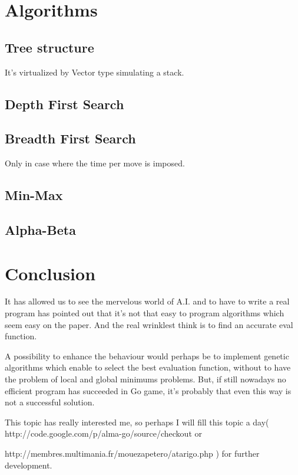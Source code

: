 \documentclass{book}
\begin{document}
\chapter{Algorithms}

\section{Tree structure}
It's virtualized by Vector type simulating a stack.
\section{Depth First Search}
\section{Breadth First Search}
Only in case where the time per move is imposed.
\section{Min-Max}
\section{Alpha-Beta}



\chapter{Conclusion}
It has allowed us to see the mervelous world of A.I. and to have to write a real program has pointed out that it's not that easy to program algorithms which seem easy on the paper.
And the real wrinklest think is to find an accurate eval function.

A possibility to enhance the behaviour would perhaps be to
 implement genetic algorithms which enable to
select the best evaluation function, without 
to have the problem of local and global 
minimums problems. But, if still nowadays no efficient program has succeeded in Go game, it's probably that even this way is not a successful solution.

This topic has really interested me, so perhaps I will fill this topic a
day( http://code.google.com/p/alma-go/source/checkout or
 
http://membres.multimania.fr/mouezapetero/atarigo.php  )  for further development.
\end{document}
